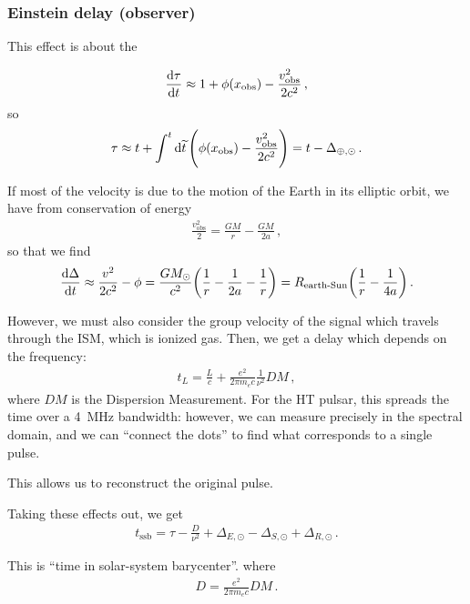 \documentclass[main.tex]{subfiles}
\begin{document}

\subsubsection{Einstein delay (observer)}

This effect is about the 

%
\begin{align}
\dv{\tau }{t} \approx 1 + \phi \qty(x _{\text{obs}}) - \frac{v^2 _{\text{obs}}}{2c^2}
\,,
\end{align}
%
so 
%
\begin{align}
\tau \approx t + \int^{t} \dd{\widetilde{t}} \qty(\phi \qty(x _{\text{obs}}) - \frac{v^2 _{\text{obs}}}{2c^2})
= t - \Delta_{\oplus, \odot}
\,.
\end{align}

If most of the velocity is due to the motion of the Earth in its elliptic orbit, we have from conservation of energy
%
\begin{align}
\frac{v^2 _{\text{obs}}}{2} = \frac{GM}{r} - \frac{GM}{2a}
\,,
\end{align}
%
so that we find 
%
\begin{align}
\dv{ \Delta}{t} \approx \frac{v^2}{2c^2} - \phi = \frac{GM_{\odot}}{c^2} \qty( \frac{1}{r} - \frac{1}{2a} - \frac{1}{r})
= R_{\text{earth-Sun}} \qty( \frac{1}{r} - \frac{1}{4a})
\,.
\end{align}

However, we must also consider the group velocity of the signal which travels through the ISM, which is ionized gas. Then, we get a delay which depends on the frequency: 
%
\begin{align}
t_L = \frac{L}{c} + \frac{e^2}{2 \pi m_e c} \frac{1}{\nu^2} DM
\,,
\end{align}
%
where \(DM\) is the Dispersion Measurement. 
For the HT pulsar, this spreads the time over a \SI{4}{MHz} bandwidth: 
however, we can measure precisely in the spectral domain, and we can ``connect the dots'' to find what corresponds to a single pulse. 

This allows us to reconstruct the original pulse.

Taking these effects out, we get 
%
\begin{align}
t _{\text{ssb}} = \tau - \frac{D}{\nu^2} + \Delta_{E, {\odot}} - \Delta_{S, {\odot}} + \Delta_{R, {\odot}}
\,.
\end{align}

This is ``time in solar-system barycenter''.
where
%
\begin{align}
D = \frac{e^2}{2 \pi m_e c} DM
\,.
\end{align}
\end{document}

